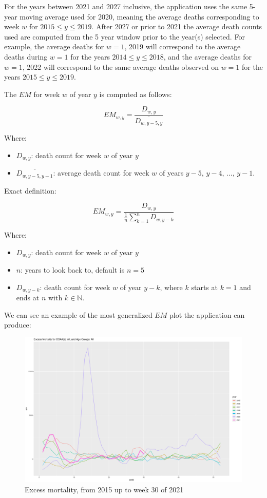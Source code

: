\documentclass[
  a4paper]{article}
\begin{document}
For the years between 2021 and 2027 inclusive, the application uses the
same 5-year moving average used for 2020, meaning the average deaths
corresponding to week \(w\) for \(2015 \leq y \leq 2019\). After 2027 or
prior to 2021 the average death counts used are computed from the 5 year
window prior to the year(s) selected. For example, the average deaths
for \(w = 1\), 2019 will correspond to the average deaths during
\(w = 1\) for the years \(2014 \leq y \leq 2018\), and the average
deaths for \(w = 1\), 2022 will correspond to the same average deaths
observed on \(w = 1\) for the years \(2015 \leq y \leq 2019\).

The \(EM\) for week \(w\) of year \(y\) is computed as follows:

\[EM_{w, y} = \frac{D_{w, y}}{\overline{D_{w, y-5, y}}}\]

Where:

\begin{itemize}
\item
  \(D_{w, y}\): death count for week \(w\) of year \(y\)
\item
  \(\overline{D_{w, y-5, y-1}}\): average death count for week \(w\) of
  years \(y-5\), \(y-4\), \(\dots\), \(y-1\).
\end{itemize}

Exact definition:

\[EM_{w, y} = \frac{D_{w, y}}{\frac{1}{n} \sum^{n}_{k=1} D_{w, y-k}}\]

Where:

\begin{itemize}
\item
  \(D_{w, y}\): death count for week \(w\) of year \(y\)
\item
  \(n\): years to look back to, default is \(n = 5\)
\item
  \(D_{w, y-k}\): death count for week \(w\) of year \(y-k\), where
  \(k\) starts at \(k=1\) and ends at \(n\) with \(k \in \mathbb{N}\).
\end{itemize}

We can see an example of the most generalized \(EM\) plot the
application can produce:

\begin{figure}
\centering
\includegraphics{./images/em.png}
\caption{Excess mortality, from 2015 up to week 30 of 2021}
\end{figure}
\end{document}
